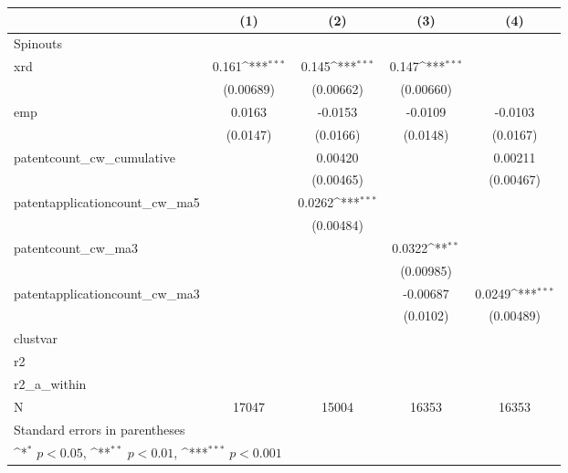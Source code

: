 {
\def\sym#1{\ifmmode^{#1}\else\(^{#1}\)\fi}
\begin{tabular}{l*{4}{c}}
\hline\hline
            &\multicolumn{1}{c}{(1)}         &\multicolumn{1}{c}{(2)}         &\multicolumn{1}{c}{(3)}         &\multicolumn{1}{c}{(4)}         \\
\hline
Spinouts    &                     &                     &                     &                     \\
xrd         &       0.161\sym{***}&       0.145\sym{***}&       0.147\sym{***}&                     \\
            &   (0.00689)         &   (0.00662)         &   (0.00660)         &                     \\
[1em]
emp         &      0.0163         &     -0.0153         &     -0.0109         &     -0.0103         \\
            &    (0.0147)         &    (0.0166)         &    (0.0148)         &    (0.0167)         \\
[1em]
patentcount\_cw\_cumulative&                     &     0.00420         &                     &     0.00211         \\
            &                     &   (0.00465)         &                     &   (0.00467)         \\
[1em]
patentapplicationcount\_cw\_ma5&                     &      0.0262\sym{***}&                     &                     \\
            &                     &   (0.00484)         &                     &                     \\
[1em]
patentcount\_cw\_ma3&                     &                     &      0.0322\sym{**} &                     \\
            &                     &                     &   (0.00985)         &                     \\
[1em]
patentapplicationcount\_cw\_ma3&                     &                     &    -0.00687         &      0.0249\sym{***}\\
            &                     &                     &    (0.0102)         &   (0.00489)         \\
\hline
clustvar    &                     &                     &                     &                     \\
r2          &                     &                     &                     &                     \\
r2\_a\_within &                     &                     &                     &                     \\
N           &       17047         &       15004         &       16353         &       16353         \\
\hline\hline
\multicolumn{5}{l}{\footnotesize Standard errors in parentheses}\\
\multicolumn{5}{l}{\footnotesize \sym{*} \(p<0.05\), \sym{**} \(p<0.01\), \sym{***} \(p<0.001\)}\\
\end{tabular}
}
